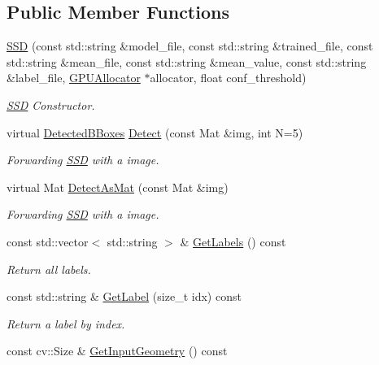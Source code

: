 \subsection*{Public Member Functions}
\begin{DoxyCompactItemize}
\item 
\mbox{\hyperlink{class_s_s_d_ab89e65721f203d52f63b5e5d833d671c}{S\+SD}} (const std\+::string \&model\+\_\+file, const std\+::string \&trained\+\_\+file, const std\+::string \&mean\+\_\+file, const std\+::string \&mean\+\_\+value, const std\+::string \&label\+\_\+file, \mbox{\hyperlink{class_g_p_u_allocator}{G\+P\+U\+Allocator}} $\ast$allocator, float conf\+\_\+threshold)
\begin{DoxyCompactList}\small\item\em \mbox{\hyperlink{class_s_s_d}{S\+SD}} Constructor. \end{DoxyCompactList}\item 
virtual \mbox{\hyperlink{_s_s_d_8h_a6145f2543054bcfbafc56318060f727b}{Detected\+B\+Boxes}} \mbox{\hyperlink{class_s_s_d_a35235278ff6d18ee494b2ccce3303c67}{Detect}} (const Mat \&img, int N=5)
\begin{DoxyCompactList}\small\item\em Forwarding \mbox{\hyperlink{class_s_s_d}{S\+SD}} with a image. \end{DoxyCompactList}\item 
virtual Mat \mbox{\hyperlink{class_s_s_d_a68c76ba1ebc94d222c1fd624db060f62}{Detect\+As\+Mat}} (const Mat \&img)
\begin{DoxyCompactList}\small\item\em Forwarding \mbox{\hyperlink{class_s_s_d}{S\+SD}} with a image. \end{DoxyCompactList}\item 
const std\+::vector$<$ std\+::string $>$ \& \mbox{\hyperlink{class_s_s_d_aca3c228118b686923b97cd120cf057c5}{Get\+Labels}} () const
\begin{DoxyCompactList}\small\item\em Return all labels. \end{DoxyCompactList}\item 
const std\+::string \& \mbox{\hyperlink{class_s_s_d_ac5c69f839f08bfa37dd33a66331f6fa3}{Get\+Label}} (size\+\_\+t idx) const
\begin{DoxyCompactList}\small\item\em Return a label by index. \end{DoxyCompactList}\item 
const cv\+::\+Size \& \mbox{\hyperlink{class_s_s_d_a20f17f5f9dbdc816f7b3ae4e30428427}{Get\+Input\+Geometry}} () const
\end{DoxyCompactItemize}

